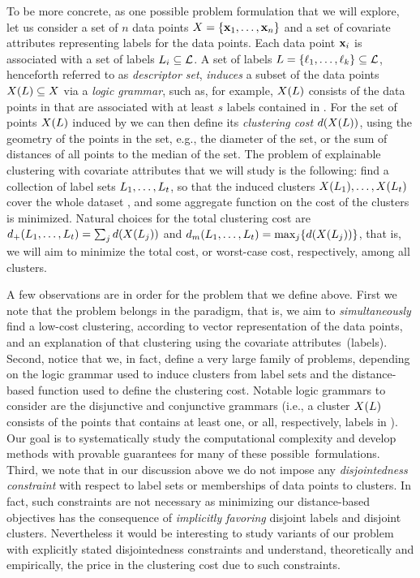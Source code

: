 \documentclass[a4paper,11pt]{article}
\begin{document}
To be more concrete, as one possible problem formulation that we will explore, 
let us consider a set of $n$ data points $X=\{\mathbf{x}_1,\ldots,\mathbf{x}_n\}$
and a set of covariate attributes {} representing labels for the data points. 
Each data point $\mathbf{x}_i$ is associated with a set of labels ${L}_i\subseteq\mathcal{L}$. 
A set of labels ${L}=\{{\ell}_1,\ldots,{\ell}_k\}\subseteq\mathcal{L}$, 
henceforth referred to as \emph{descriptor set}, 
\emph{induces} a subset of the data points $X({L})\subseteq X$
via a \emph{logic grammar}, such as, for example, 
$X({L})$ consists of the data points in \dataset that 
are associated with at least $s$ labels contained in .
For the set of points $X({L})$ induced by  
we can then define its \emph{clustering cost} $d(X({L}))$, 
using the geometry of the points in the set, 
e.g., the diameter of the set, or the sum of distances of all points to the median of the set.
The problem of explainable clustering with covariate attributes that we will study is the following: 
find a collection of label sets ${L}_1,\ldots,{L}_t$, 
so that the induced clusters $X({L}_1),\ldots,X({L}_t)$
cover the whole dataset \dataset, 
and some aggregate function on the cost of the clusters is minimized. 
Natural choices for the total clustering cost are
$d_{+}({L}_1,\ldots,{L}_t) = \sum_{j} d(X({L}_j))$ and 
$d_{m}({L}_1,\ldots,{L}_t) = \max_{j}\! \left\{ d(X({L}_j)) \right\}$, 
that is, we will aim to minimize the total cost, or worst-case cost, respectively, 
among all clusters. 

A few observations are in order for the problem that we define above.
First we note that the problem belongs in the \joint paradigm, 
that is, we aim to \emph{simultaneously} find a low-cost clustering, 
according to vector representation of the data points,
and an explanation of that clustering using the covariate attributes~(labels).
%
Second, notice that we, in fact, define a very large family of problems, 
depending on the logic grammar used to induce clusters from label sets
and the distance-based function used to define the clustering cost.
Notable logic grammars to consider are the disjunctive and conjunctive grammars 
(i.e., a cluster $X({L})$ consists of the points 
that contains at least one, or all, respectively, labels in ).
Our goal is to systematically study the computational complexity and 
develop methods with provable guarantees
for many of these possible~formulations.
%
Third, we note that in our discussion above we do not impose any
\emph{disjointedness constraint} with respect to label sets or 
memberships of data points to clusters. 
In fact, such constraints are not necessary as minimizing 
our distance-based objectives has the consequence of \emph{implicitly favoring}
disjoint labels and disjoint clusters.
Nevertheless it would be interesting to study variants
of our problem with explicitly stated disjointedness constraints
and understand, theoretically and empirically, 
the price in the clustering cost due to such constraints.
\end{document}
